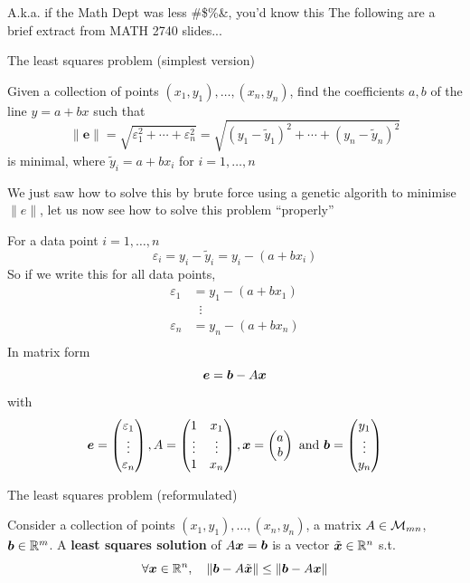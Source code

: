 \documentclass[aspectratio=169]{beamer}
\begin{document}
\begin{frame}{A.k.a. if the Math Dept was less \#\$\%\&, you'd know this}
	The following are a brief extract from MATH 2740 slides...
\end{frame}


\begin{frame}{The least squares problem (simplest version)}
	\begin{definition}
		Given a collection of points $(x_1,y_1),\ldots,(x_n,y_n)$, find the coefficients $a,b$ of the line $y=a+bx$ such that
		$$
		\|\mathbf{e}\|=\sqrt{\varepsilon_1^2+\cdots+\varepsilon_n^2}
		=\sqrt{(y_1-\tilde y_1)^2+\cdots+(y_n-\tilde y_n)^2}
		$$
		is minimal, where $\tilde y_i=a+bx_i$ for $i=1,\ldots,n$
	\end{definition}
	\vfill
	We just saw how to solve this by brute force using a genetic algorith to minimise $\|e\|$, let us now see how to solve this problem ``properly''
\end{frame}


\begin{frame}
	For a data point $i=1,\ldots,n$
	\[
	\varepsilon_i = y_i-\tilde y_i = y_i - (a+bx_i)
	\]
	So if we write this for all data points,
	\begin{align*}
	\varepsilon_1 &= y_1 - (a+bx_1) \\
	&\;\;\vdots \\
	\varepsilon_n &= y_n - (a+bx_n) \\
	\end{align*}
	In matrix form
	\[
	\bm{e} = \bm{b}-A\bm{x}
	\]
	with
	\[
	\bm{e} = \begin{pmatrix}
	\varepsilon_1\\ \vdots\\ \varepsilon_n
	\end{pmatrix},
	A=\begin{pmatrix}
	1 & x_1 \\ \vdots & \vdots \\ 1 & x_n
	\end{pmatrix},
	\bm{x} = \begin{pmatrix}
	a\\b
	\end{pmatrix}\textrm{ and }
	\bm{b} = \begin{pmatrix}
	y_1\\ \vdots\\ y_n
	\end{pmatrix}
	\]
\end{frame}

\begin{frame}{The least squares problem (reformulated)}
\begin{definition}
Consider a collection of points $(x_1,y_1),\ldots,(x_n,y_n)$, a matrix $A\in\mathcal{M}_{mn}$, $\bm{b}\in\mathbb{R}^m$. A \textbf{least squares solution} of $A\bm{x}=\bm{b}$ is a vector $\tilde {\bm{x}}\in\mathbb{R}^n$ s.t.
\[
\forall \bm{x}\in\mathbb{R}^n,\quad \|\bm{b}-A\tilde{\bm{x}}\|\leq \|\bm{b}-A\bm{x}\|
\]
\end{definition}
\end{frame}
\end{document}
